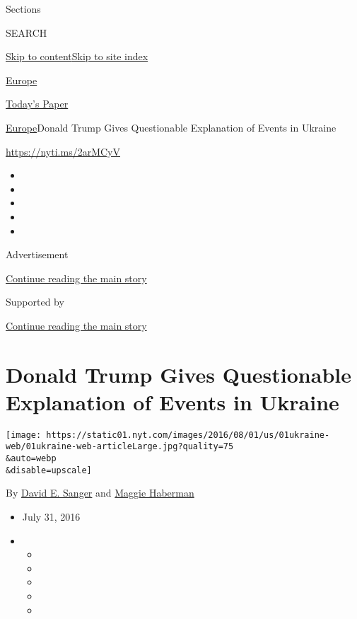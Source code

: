 Sections

SEARCH

\protect\hyperlink{site-content}{Skip to
content}\protect\hyperlink{site-index}{Skip to site index}

\href{https://www.nytimes.com/section/world/europe}{Europe}

\href{https://myaccount.nytimes.com/auth/login?response_type=cookie\&client_id=vi}{}

\href{https://www.nytimes.com/section/todayspaper}{Today's Paper}

\href{/section/world/europe}{Europe}\textbar{}Donald Trump Gives
Questionable Explanation of Events in Ukraine

\url{https://nyti.ms/2arMCyV}

\begin{itemize}
\item
\item
\item
\item
\item
\end{itemize}

Advertisement

\protect\hyperlink{after-top}{Continue reading the main story}

Supported by

\protect\hyperlink{after-sponsor}{Continue reading the main story}

\hypertarget{donald-trump-gives-questionable-explanation-of-events-in-ukraine}{%
\section{Donald Trump Gives Questionable Explanation of Events in
Ukraine}\label{donald-trump-gives-questionable-explanation-of-events-in-ukraine}}

\texttt{[image: https://static01.nyt.com/images/2016/08/01/us/01ukraine-web/01ukraine-web-articleLarge.jpg?quality=75\\\&auto=webp\\\&disable=upscale]}

By \href{http://www.nytimes.com/by/david-e-sanger}{David E. Sanger} and
\href{http://www.nytimes.com/by/maggie-haberman}{Maggie Haberman}

\begin{itemize}
\item
  July 31, 2016
\item
  \begin{itemize}
  \item
  \item
  \item
  \item
  \item
  \end{itemize}
\end{itemize}


